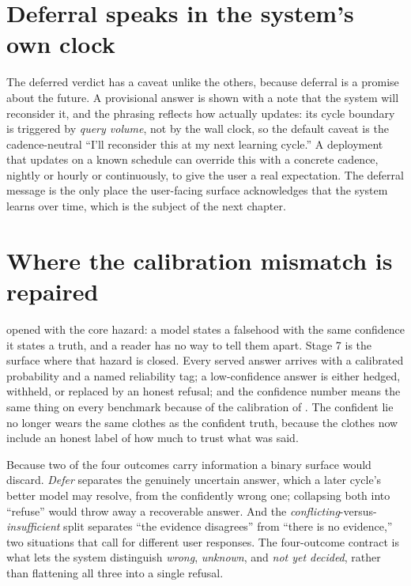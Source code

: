\section{Deferral speaks in the system's own clock}
\label{sec:output-defer}

The deferred verdict has a caveat unlike the others, because deferral is a promise
about the future. A provisional answer is shown with a note that the system will
reconsider it, and the phrasing reflects how \caem{} actually updates: its cycle
boundary is triggered by \emph{query volume}, not by the wall clock, so the default
caveat is the cadence-neutral ``I'll reconsider this at my next learning cycle.'' A
deployment that updates on a known schedule can override this with a concrete cadence,
nightly or hourly or continuously, to give the user a real expectation. The deferral
message is the only place the user-facing surface acknowledges that the system learns
over time, which is the subject of the next chapter.

\section{Where the calibration mismatch is repaired}
\label{sec:output-repair}

 opened with the core hazard: a model states a falsehood with the
same confidence it states a truth, and a reader has no way to tell them apart. Stage 7
is the surface where that hazard is closed. Every served answer arrives with a
calibrated probability and a named reliability tag; a low-confidence answer is either
hedged, withheld, or replaced by an honest refusal; and the confidence number means
the same thing on every benchmark because of the calibration of .
The confident lie no longer wears the same clothes as the confident truth, because the
clothes now include an honest label of how much to trust what was said.

\begin{defence}
Because two of the four outcomes carry information a binary surface would discard.
\emph{Defer} separates the genuinely uncertain answer, which a later cycle's better
model may resolve, from the confidently wrong one; collapsing both into ``refuse''
would throw away a recoverable answer. And the \emph{conflicting}-versus-%
\emph{insufficient} split separates ``the evidence disagrees'' from ``there is no
evidence,'' two situations that call for different user responses. The four-outcome
contract is what lets the system distinguish \emph{wrong}, \emph{unknown}, and
\emph{not yet decided}, rather than flattening all three into a single refusal.
\end{defence}

